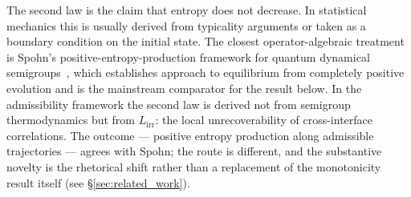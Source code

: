 \documentclass[11pt]{article}
\begin{document}
The second law is the claim that entropy does not decrease.  In statistical
mechanics this is usually derived from typicality arguments or taken as a
boundary condition on the initial state.  The closest operator-algebraic
treatment is Spohn's positive-entropy-production framework for quantum
dynamical semigroups~\cite{Spohn1978}, which establishes approach to
equilibrium from completely positive evolution and is the mainstream
comparator for the result below.  In the admissibility framework the
second law is derived not from semigroup thermodynamics but from
$L_{\mathrm{irr}}$: the local unrecoverability of cross-interface
correlations.  The outcome --- positive entropy production along admissible
trajectories --- agrees with Spohn; the route is different, and the
substantive novelty is the rhetorical shift rather than a replacement of
the monotonicity result itself (see \S\ref{sec:related_work}).
\end{document}
